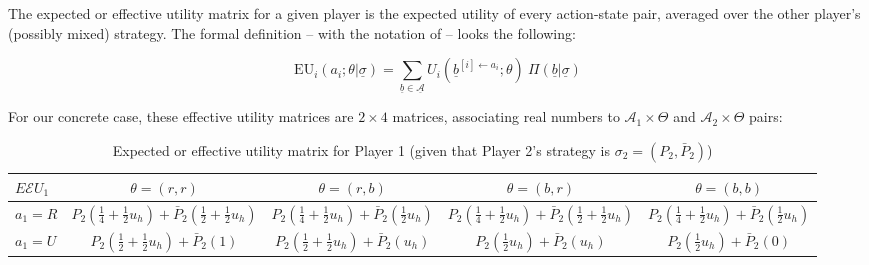 \documentclass{article}
\theoremstyle{definition}
\begin{document}
The expected or effective utility matrix for a given player is the expected utility of every action-state pair, averaged over the other player’s (possibly mixed) strategy.
The formal definition – with the notation of \cite{arxiv:ExtendedEquilibrium} – looks the following:

    \begin{equation}
    \label{defeq:EUMatrix}
        \mathrm{EU}_i(a_i;\theta | \underline{\sigma}) = 
        \sum_{\underline{b} \in \underline{\mathcal{A}}} U_i(\underline{b}^{[i] \leftarrow a_i};\theta) \ \Pi(\underline{b}|\underline{\sigma})
    \end{equation}

For our concrete case, these effective utility matrices are $2 \times4$ matrices, associating real numbers to $\mathcal{A}_1 \times \Theta$ and $\mathcal{A}_2 \times \Theta$ pairs:

\begin{table}[H]
    \label{tab:UtilityGeneralUncertaintyIndividualistic}
\begin{center}
\small
\renewcommand{\arraystretch}{1.3} %
\begin{tabular}{| l|c c c c|}
\hline
\multirow{1}{*}{$E\mathcal{E}U_1$} & $\theta=(r,r)$  & $\theta=(r,b)$ & $\theta=(b,r)$ & $\theta=(b,b)$\\
\hline
  $a_1=R$ &
  $P_2(\frac{1}{4} +  \frac{1}{2} u_h) + \bar{P}_2 (\frac{1}{2} + \frac{1}{2} u_h)$ &
  $P_2(\frac{1}{4} +  \frac{1}{2} u_h) + \bar{P}_2 (\frac{1}{2} u_h)$ &
  $P_2(\frac{1}{4} +  \frac{1}{2} u_h) + \bar{P}_2 (\frac{1}{2} + \frac{1}{2} u_h)$ &
  $P_2(\frac{1}{4} +  \frac{1}{2} u_h) + \bar{P}_2 (\frac{1}{2} u_h)$\\
\cline{1-5}
  $a_1=U$ &
  $P_2(\frac{1}{2} + \frac{1}{2} u_h)+\bar{P}_2(1)$ &
  $P_2(\frac{1}{2} + \frac{1}{2} u_h)+\bar{P}_2(u_h)$ &
  $P_2(\frac{1}{2} u_h) + \bar{P}_2 (u_h)$ &
  $P_2(\frac{1}{2} u_h) + \bar{P}_2 (0)$\\
\hline
\end{tabular}
\caption{Expected or effective utility matrix for Player 1 (given that Player 2's strategy is $\sigma_2=(P_2,\bar{P}_2)$)}
\end{center}
\end{table}
\end{document}
